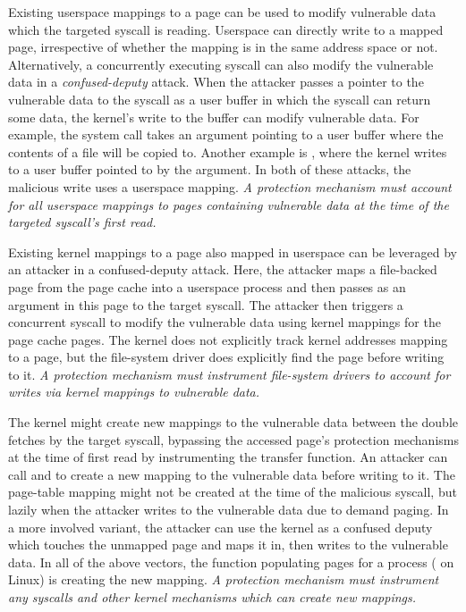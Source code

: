 \documentclass[letterpaper,twocolumn,10pt]{article}
\begin{document}
Existing userspace mappings to a page can be used to modify
vulnerable data which the targeted syscall is reading.
Userspace can directly write to a mapped page, irrespective of whether the mapping is
in the same address space or not.
Alternatively, a concurrently executing syscall can also modify the
vulnerable data in a \emph{confused-deputy} attack.
When the attacker passes a pointer to the vulnerable data to
the syscall as a user buffer in which the syscall can return some
data, the kernel's write to the buffer can modify vulnerable data.
For example, the  system call takes an argument pointing
to a user buffer where the contents of a file will be copied to.
Another example is , where the kernel writes to
a user buffer pointed to by the  argument.
In both of these attacks, the malicious write uses a userspace
mapping.
\emph{A protection mechanism must account for all userspace
mappings to pages containing vulnerable data at the time of the
targeted syscall's first read.}

Existing kernel mappings to a page also mapped in userspace can be
leveraged by an attacker in a confused-deputy attack.
Here, the attacker maps a file-backed page from the page cache into a
userspace process and then passes as an argument in this page to the
target syscall.
The attacker then triggers a concurrent  syscall to modify the
vulnerable data using kernel mappings for the page cache
pages.
The kernel does not explicitly track kernel addresses mapping to a page,
but the file-system driver does explicitly find the page before writing to it.
\emph{A protection mechanism must instrument file-system
drivers to account for writes via kernel mappings to vulnerable data.}

The kernel might create new mappings to the vulnerable data
between the double fetches by the target syscall, bypassing the accessed page's
protection mechanisms at the time of first read by
instrumenting the transfer function.
An attacker can call  and  to create
a new mapping to the vulnerable data before writing to it.
The page-table mapping might not be created at the time of the malicious
syscall, but lazily when the attacker writes to the vulnerable data
due to demand paging.
In a more involved variant, the attacker can use the kernel as a
confused deputy which touches the unmapped page and maps it in,
then writes to the vulnerable data.
In all of the above vectors, the function populating pages for a
process ( on Linux) is creating the new mapping.
\emph{A protection mechanism must instrument any syscalls
and other kernel mechanisms which can create new mappings.}
\end{document}
